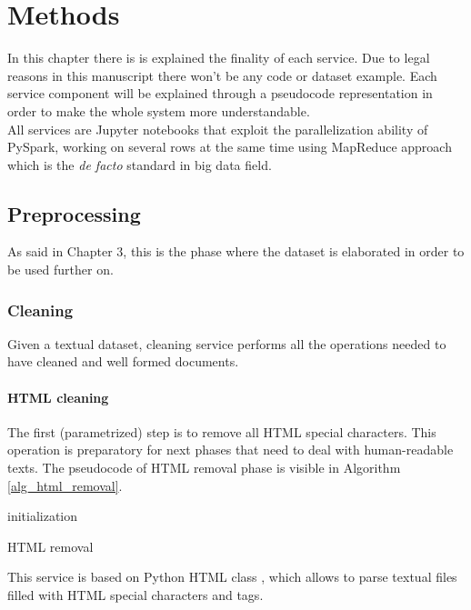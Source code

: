 \documentclass[\main/main.tex]{subfiles}
\begin{document}
\chapter{Methods}
\label{methods}
In this chapter there is is explained the finality of each service. Due to legal reasons in this manuscript there won't be any code or dataset example. Each service component will be explained through a pseudocode representation in order to make the whole system more understandable.\\
All services are Jupyter notebooks that exploit the parallelization ability of PySpark, working on several rows at the same time using MapReduce approach which is the \emph{de facto} standard in big data field.
\section{Preprocessing}
As said in Chapter 3, this is the phase where the dataset is elaborated in order to be used further on. 
\subsection{Cleaning}
Given a textual dataset, cleaning service performs all the operations needed to have cleaned and well formed documents.
\subsubsection{HTML cleaning}
The first (parametrized) step is to remove all HTML special characters. This operation is preparatory for next phases that need to deal with human-readable texts. The pseudocode of HTML removal phase is visible in Algorithm \ref{alg_html_removal}.
\begin{center}
    \begin{algorithm}[H]
     initialization \\
     \caption{HTML removal}
     \label{alg_html_removal}
    \end{algorithm}
\end{center}
This service is based on Python HTML class \cite{html_parser}, which allows to parse textual files filled with HTML special characters and tags.
\end{document}
